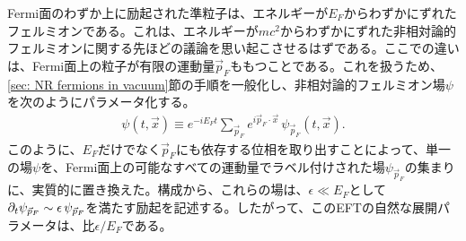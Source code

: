 Fermi面のわずか上に励起された準粒子は、エネルギーが$E_F$からわずかにずれたフェルミオンである。これは、エネルギーが$m c^2$からわずかにずれた非相対論的フェルミオンに関する先ほどの議論を思い起こさせるはずである。ここでの違いは、Fermi面上の粒子が有限の運動量${\vec p}_F$ももつことである。これを扱うため、\ref{sec: NR fermions in vacuum}節の手順を一般化し、非相対論的フェルミオン場$\psi$を次のようにパラメータ化する。
%
\begin{align} \label{Psi tilde def}
	\psi (t, \vec x) \equiv e^{- i E_{F} t} \sum_{{\vec p}_F} e^{i {\vec p}_F \cdot \vec x} \, \psi_{{\vec p}_F} (t, \vec x) .
\end{align}
%
このように、$E_F$だけでなく$\vec p_F$にも依存する位相を取り出すことによって、単一の場$\psi$を、Fermi面上の可能なすべての運動量でラベル付けされた場$\psi_{{\vec p}_F}$の集まりに、実質的に置き換えた。構成から、これらの場は、$\epsilon \ll E_F$として$\partial_t \psi_{{\vec p}_F} \sim \epsilon \,\psi_{{\vec p}_F}$を満たす励起を記述する。したがって、このEFTの自然な展開パラメータは、比$\epsilon / E_F$である。

